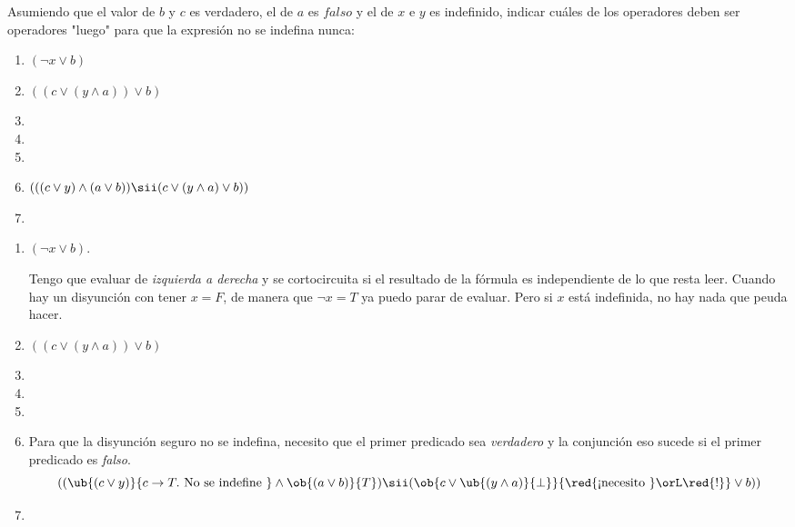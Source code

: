 \begin{enunciado}{\ejercicio}
  Asumiendo que el valor de $b$ y $c$ es verdadero, el de $a$ es $falso$ y el de $x$ e $y$ es indefinido, indicar cuáles de los operadores
  deben ser operadores "luego" para que la expresión no se indefina nunca:\par
  \begin{enumerate}[label=\alph*)]
    \item $(\neg x \lor b)$
    \item $((c \lor (y \land a)) \lor b)$
    \item
    \item
    \item
    \item $(((c \lor y) \land (a \lor b)) \sii (c \lor (y \land a) \lor b))$
    \item
  \end{enumerate}
\end{enunciado}

\begin{enumerate}[label=\alph*)]
  \item $(\neg x \lor b)$.\par
        Tengo que evaluar de \textit{izquierda a derecha} y se cortocircuita si el resultado de la fórmula es independiente de lo que resta leer.
        Cuando hay un disyunción con tener $x = F$, de manera que $\neg x = T$ ya puedo parar de evaluar. Pero si $x$ está indefinida, no hay nada que
        peuda hacer.

  \item $((c \lor (y \land a)) \lor b)$
  \item
  \item
  \item
  \item
        Para que la disyunción seguro no se indefina, necesito que el primer predicado sea \textit{verdadero} y la conjunción eso sucede si el primer predicado
        es \textit{falso}.
        $$
          ((\ub{(c \lor y)}{c \to T.\text{ No se indefine }} \land \ob{(a \lor b)}{T}) \sii (\ob{c \lor \ub{(y \land a)}{\perp}}{\text{\red{¡necesito }}\orL \red{!}} \lor b))
        $$
  \item
\end{enumerate}
